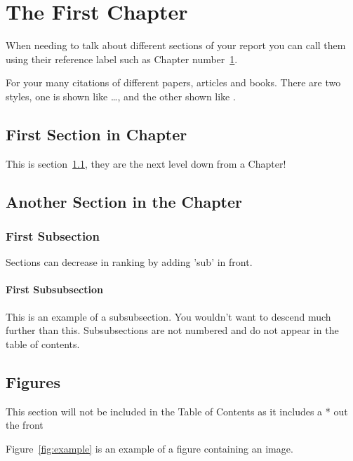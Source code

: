 \chapter{The First Chapter}\label{chap:first}

When needing to talk about different sections of your report you can call them using their reference label such as Chapter number~\ref{chap:first}.

For your many citations of different papers, articles and books. There are two styles, one is shown like \dots \citet{Honsinger71a}, and the other shown like \citep{EPRI01}.

\section{First Section in Chapter}\label{first:sec}

This is section~\ref{first:sec}, they are the next level down from a Chapter!

\section{Another Section in the Chapter}

\subsection{First Subsection}

Sections can decrease in ranking by adding 'sub' in front.

\subsubsection{First Subsubsection}

This is an example of a subsubsection. You wouldn't want to descend much further
than this. Subsubsections are not numbered and do not appear in the table of
contents.

\section*{Figures}

This section will not be included in the Table of Contents as it includes a * out the front

Figure~\ref{fig:example} is an example of a figure containing an image.

